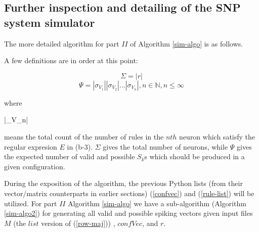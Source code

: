 \documentclass{acm_proc_article-sp}
\begin{document}
\subsection{Further inspection and detailing of the SNP system
simulator}
	
The more detailed algorithm for part $II$ of Algorithm \ref{sim-algo} is as follows.

A few definitions are in order at this point:

\begin{equation}\label{sigma}
\Sigma =  |r| 
\end{equation}
\begin{equation}\label{psi}
\Psi = |{\sigma_V_1}| |{\sigma_V_2}| ...|{\sigma_V_n}|, n \in \mathbb{N}, n \leq \infty
\end{equation}

where

|{\sigma_V_n}|

means the total count of the number of rules in the $nth$ neuron which satisfy the regular expresion $E$ in (b-3). $\Sigma$ gives the total number of neurons, while $\Psi$ gives the expected number of valid and possible $S_k$s which should be produced in a given configuration.


During the exposition of the algorithm, the previous Python
lists (from their vector/matrix counterparts in earlier
sections) (\ref{confvec}) and (\ref{rule-list}) will be utilized. For part $II$ Algorithm \ref{sim-algo} we have a sub-algorithm (Algorithm \ref{sim-algo2}) for generating all valid
and possible spiking vectors given input files $M$ (the $list$ version of (\ref{row-maj})) , $confVec$, and $r$.
\end{document}
